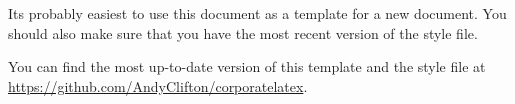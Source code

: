 Its probably easiest to use this document as a template for a new document. You should also make sure that you have the most recent version of the style file.

You can find the most up-to-date version of this template and the style file at \href{https://github.com/AndyClifton/CorporateLatex}{https://github.com/AndyClifton/corporatelatex}.
